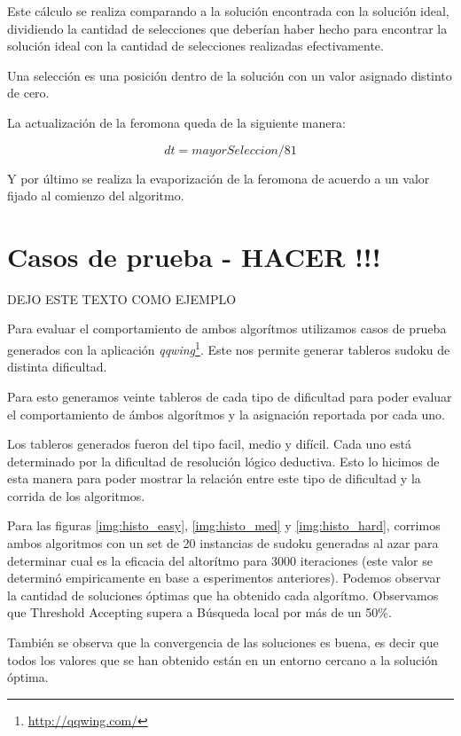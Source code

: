 \documentclass[a4paper,spanish]{article}
\begin{document}
Este cálculo se realiza comparando a la solución encontrada con la solución ideal, dividiendo la cantidad de selecciones que deberían 
haber hecho para encontrar la solución ideal con la cantidad de selecciones realizadas efectivamente.

Una selección es una posición dentro de la solución con un valor asignado distinto de cero.

La actualización de la feromona queda de la siguiente manera:

\begin{equation}
	dt=mayorSeleccion/81
\end{equation}

Y por último se realiza la evaporización de la feromona de acuerdo a un valor fijado al comienzo del algoritmo.



\clearpage

\section{Casos de prueba - HACER !!!}

DEJO ESTE TEXTO COMO EJEMPLO

Para evaluar el comportamiento de ambos algorítmos utilizamos casos de prueba
generados con la aplicación \emph{qqwing}\footnote{\url{http://qqwing.com/}}. Este nos permite generar tableros
sudoku de distinta dificultad.

Para esto generamos veinte tableros de cada tipo de dificultad para poder
evaluar el comportamiento de ámbos algorítmos y la asignación reportada por cada
uno.

Los tableros generados fueron del tipo facil, medio y difícil. Cada uno está
determinado por la dificultad de resolución lógico deductiva. Esto lo hicimos de
esta manera para poder mostrar la relación entre este tipo de dificultad y la
corrida de los algoritmos.

Para las figuras  \ref{img:histo_easy}, \ref{img:histo_med} y
\ref{img:histo_hard}, corrimos ambos algoritmos con un set de 20 instancias de
sudoku generadas al azar para determinar cual es la eficacia del altorítmo para
3000 iteraciones (este valor se determinó empiricamente en base a esperimentos
anteriores).
Podemos observar la cantidad de soluciones óptimas que ha obtenido cada
algorítmo. Observamos que Threshold Accepting supera a Búsqueda local por más de
un 50\%.

También se observa que la convergencia de las soluciones es buena, es decir que
todos los valores que se han obtenido están en un entorno cercano a la solución
óptima.
\end{document}
